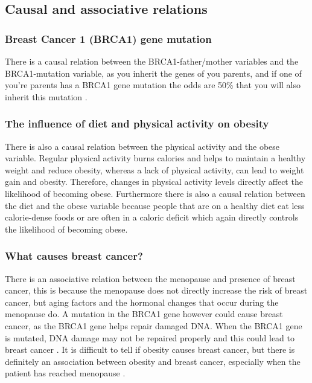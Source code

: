 \documentclass{article}
\begin{document}
\subsection{Causal and associative relations}
\subsubsection{Breast Cancer 1 (BRCA1) gene mutation}
There is a causal relation between the BRCA1-father/mother variables and the BRCA1-mutation variable, as you inherit the genes of you parents, and if one of you're parents has a BRCA1 gene mutation the odds are 50\% that you will also inherit this mutation \cite{cancergov}.
\subsubsection{The influence of diet and physical activity on obesity} 
There is also a causal relation between the physical activity and the obese variable. Regular physical activity burns calories and helps to maintain a healthy weight and reduce obesity, whereas a lack of physical activity, can lead to weight gain and obesity.
  Therefore, changes in physical activity levels directly affect the likelihood of becoming obese. Furthermore there is also a causal relation between the diet 
  and the obese variable because people that are on a healthy diet eat less calorie-dense foods or are often in a caloric deficit which again directly controls the likelihood of becoming obese.
\subsubsection{What causes breast cancer?}
There is an associative relation between the menopause and presence of breast cancer, this is because the menopause does not directly increase the risk of breast cancer, but aging factors and the hormonal changes that occur during the menopause do.
A mutation in the BRCA1 gene however could cause breast cancer, as the BRCA1 gene helps repair damaged DNA. When the BRCA1 gene is mutated, DNA damage may not be repaired properly and this could lead to breast cancer \cite{brca1}.
It is difficult to tell if obesity causes breast cancer, but there is definitely an association between obesity and breast cancer, especially when the patient has reached menopause \cite{agurs2019many}.
\end{document}
